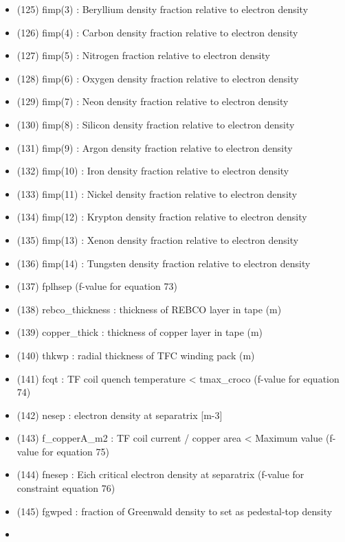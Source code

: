 \documentclass[]{article}
\begin{document}
\begin{itemize}
\begin{itemize}
  \item
    (125) fimp(3) : Beryllium density fraction relative to electron
    density
  \item
    (126) fimp(4) : Carbon density fraction relative to electron density
  \item
    (127) fimp(5) : Nitrogen fraction relative to electron density
  \item
    (128) fimp(6) : Oxygen density fraction relative to electron density
  \item
    (129) fimp(7) : Neon density fraction relative to electron density
  \item
    (130) fimp(8) : Silicon density fraction relative to electron
    density
  \item
    (131) fimp(9) : Argon density fraction relative to electron density
  \item
    (132) fimp(10) : Iron density fraction relative to electron density
  \item
    (133) fimp(11) : Nickel density fraction relative to electron
    density
  \item
    (134) fimp(12) : Krypton density fraction relative to electron
    density
  \item
    (135) fimp(13) : Xenon density fraction relative to electron density
  \item
    (136) fimp(14) : Tungsten density fraction relative to electron
    density
  \item
    (137) fplhsep (f-value for equation 73)
  \item
    (138) rebco\_thickness : thickness of REBCO layer in tape (m)
  \item
    (139) copper\_thick : thickness of copper layer in tape (m)
  \item
    (140) thkwp : radial thickness of TFC winding pack (m)
  \item
    (141) fcqt : TF coil quench temperature \textless{} tmax\_croco
    (f-value for equation 74)
  \item
    (142) nesep : electron density at separatrix {[}m-3{]}
  \item
    (143) f\_copperA\_m2 : TF coil current / copper area \textless{}
    Maximum value (f-value for equation 75)
  \item
    (144) fnesep : Eich critical electron density at separatrix (f-value
    for constraint equation 76)
  \item
    (145) fgwped : fraction of Greenwald density to set as pedestal-top
    density
  \item

\end{itemize}
\end{itemize}
\end{document}
